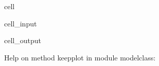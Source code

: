 \documentclass[letterpaper,10pt,english]{jupyterBook}
\begin{document}
\begin{sphinxuseclass}{cell}\begin{sphinxVerbatimInput}

\begin{sphinxuseclass}{cell_input}
\begin{sphinxVerbatim}[commandchars=\\\{\}]
\end{sphinxVerbatim}

\end{sphinxuseclass}\end{sphinxVerbatimInput}
\begin{sphinxVerbatimOutput}

\begin{sphinxuseclass}{cell_output}
\begin{sphinxVerbatim}[commandchars=\\\{\}]
Help on method keep\PYGZus{}plot in module modelclass:


\end{sphinxVerbatim}
\end{sphinxuseclass}
\end{sphinxVerbatimOutput}
\end{sphinxuseclass}
\end{document}
